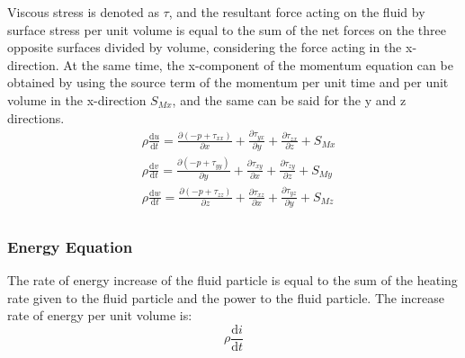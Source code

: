 \documentclass{apmcmthesis}
\begin{document}
Viscous stress is denoted as $\tau$, and the resultant force acting on the fluid by surface stress per unit volume is equal to the sum of the net forces on the three opposite surfaces divided by volume, considering the force acting in the x-direction. At the same time, the x-component of the momentum equation can be obtained by using the source term of the momentum per unit time and per unit volume in the x-direction $S_{Mx}$, and the same can be said for the y and z directions.
\begin{equation}
\begin{aligned}
&\rho \frac{\mathrm{d} u}{\mathrm{d} t} =\frac{\partial (-p+\tau _{xx}) }{\partial x} +\frac{\partial \tau _{yx}}{\partial y}+\frac{\partial \tau _{zx}}{\partial z}+S_{Mx}\\
&\rho \frac{\mathrm{d} v}{\mathrm{d} t} =\frac{\partial (-p+\tau _{yy}) }{\partial y} +\frac{\partial \tau _{xy}}{\partial x}+\frac{\partial \tau _{zy}}{\partial z}+S_{My}\\
&\rho \frac{\mathrm{d} w}{\mathrm{d} t} =\frac{\partial (-p+\tau _{zz}) }{\partial z} +\frac{\partial \tau _{xz}}{\partial x}+\frac{\partial \tau _{yz}}{\partial y}+S_{Mz}\\
\end{aligned}
\end{equation}

\subsubsection{Energy Equation}

The rate of energy increase of the fluid particle is equal to the sum of the heating rate given to the fluid particle and the power to the fluid particle. The increase rate of energy per unit volume is:
$$\rho \frac{\mathrm{d} i}{\mathrm{d} t} $$
\end{document}
